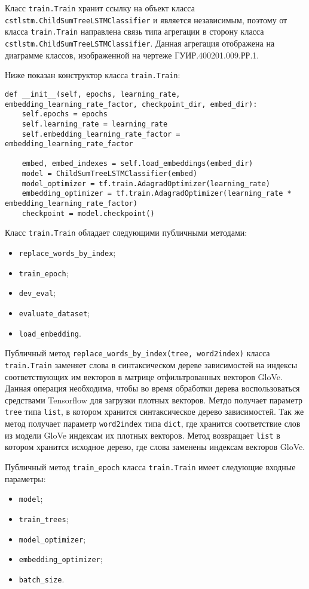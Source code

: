 Класс \texttt{train.Train} хранит ссылку на объект класса \texttt{cstlstm.ChildSum\-TreeLSTMClassifier} и является независимым, поэтому от класса \texttt{train.Tra\-in} направлена связь типа агрегации в сторону класса \texttt{cstlstm.ChildSumTree\-LSTMClassifier}. Данная агрегация отображена на диаграмме классов, изображенной на чертеже ГУИР.400201.009.РР.1.

Ниже показан конструктор класса \texttt{train.Train}:
\medskip
\begin{lstlisting}[style=Python]
  def __init__(self, epochs, learning_rate, embedding_learning_rate_factor, checkpoint_dir, embed_dir):
    self.epochs = epochs
    self.learning_rate = learning_rate
    self.embedding_learning_rate_factor = embedding_learning_rate_factor

    embed, embed_indexes = self.load_embeddings(embed_dir)
    model = ChildSumTreeLSTMClassifier(embed)
    model_optimizer = tf.train.AdagradOptimizer(learning_rate)
    embedding_optimizer = tf.train.AdagradOptimizer(learning_rate * embedding_learning_rate_factor)
    checkpoint = model.checkpoint()
\end{lstlisting}
\medskip

Класс \texttt{train.Train} обладает следующими публичными методами:
\begin{itemize}
\item \texttt{replace\_words\_by\_index};
\item \texttt{train\_epoch};
\item \texttt{dev\_eval};
\item \texttt{evaluate\_dataset};
\item \texttt{load\_embedding}.
\end{itemize}

Публичный метод \texttt{replace\_words\_by\_index(tree, word2index)} класса \texttt{train.Train} заменяет слова в синтаксическом дереве зависимостей на индексы соответствующих им векторов в матрице отфильтрованных векторов GloVe. Данная операция необходима, чтобы во время обработки дерева воспользоваться средствами Tensorflow для загрузки плотных векторов.  Метдо получает параметр \texttt{tree} типа \texttt{list}, в котором хранится синтаксическое дерево зависимостей. Так же метод получает параметр \texttt{word2index} типа \texttt{dict}, где хранится соответствие слов из модели GloVe индексам их плотных векторов. Метод возвращает \texttt{list} в котором хранится исходное дерево, где слова заменены индексам векторов GloVe.

Публичный метод \texttt{train\_epoch} класса \texttt{train.Train} имеет следующие входные параметры:
\begin{itemize}
\item \texttt{model};
\item \texttt{train\_trees};
\item \texttt{model\_optimizer};
\item \texttt{embedding\_optimizer};
\item \texttt{batch\_size}.
\end{itemize}

